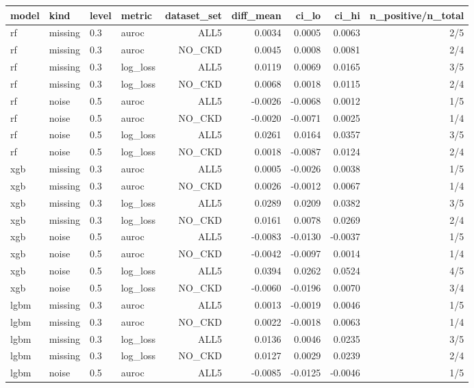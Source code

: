 \begin{tabular}{llllrrrrr}
\toprule
model & kind & level & metric & dataset\_set & diff\_mean & ci\_lo & ci\_hi & n\_positive/n\_total \\
\midrule
rf & missing & 0.3 & auroc & ALL5 & 0.0034 & 0.0005 & 0.0063 & 2/5 \\
rf & missing & 0.3 & auroc & NO\_CKD & 0.0045 & 0.0008 & 0.0081 & 2/4 \\
rf & missing & 0.3 & log\_loss & ALL5 & 0.0119 & 0.0069 & 0.0165 & 3/5 \\
rf & missing & 0.3 & log\_loss & NO\_CKD & 0.0068 & 0.0018 & 0.0115 & 2/4 \\
rf & noise & 0.5 & auroc & ALL5 & -0.0026 & -0.0068 & 0.0012 & 1/5 \\
rf & noise & 0.5 & auroc & NO\_CKD & -0.0020 & -0.0071 & 0.0025 & 1/4 \\
rf & noise & 0.5 & log\_loss & ALL5 & 0.0261 & 0.0164 & 0.0357 & 3/5 \\
rf & noise & 0.5 & log\_loss & NO\_CKD & 0.0018 & -0.0087 & 0.0124 & 2/4 \\
xgb & missing & 0.3 & auroc & ALL5 & 0.0005 & -0.0026 & 0.0038 & 1/5 \\
xgb & missing & 0.3 & auroc & NO\_CKD & 0.0026 & -0.0012 & 0.0067 & 1/4 \\
xgb & missing & 0.3 & log\_loss & ALL5 & 0.0289 & 0.0209 & 0.0382 & 3/5 \\
xgb & missing & 0.3 & log\_loss & NO\_CKD & 0.0161 & 0.0078 & 0.0269 & 2/4 \\
xgb & noise & 0.5 & auroc & ALL5 & -0.0083 & -0.0130 & -0.0037 & 1/5 \\
xgb & noise & 0.5 & auroc & NO\_CKD & -0.0042 & -0.0097 & 0.0014 & 1/4 \\
xgb & noise & 0.5 & log\_loss & ALL5 & 0.0394 & 0.0262 & 0.0524 & 4/5 \\
xgb & noise & 0.5 & log\_loss & NO\_CKD & -0.0060 & -0.0196 & 0.0070 & 3/4 \\
lgbm & missing & 0.3 & auroc & ALL5 & 0.0013 & -0.0019 & 0.0046 & 1/5 \\
lgbm & missing & 0.3 & auroc & NO\_CKD & 0.0022 & -0.0018 & 0.0063 & 1/4 \\
lgbm & missing & 0.3 & log\_loss & ALL5 & 0.0136 & 0.0046 & 0.0235 & 3/5 \\
lgbm & missing & 0.3 & log\_loss & NO\_CKD & 0.0127 & 0.0029 & 0.0239 & 2/4 \\
lgbm & noise & 0.5 & auroc & ALL5 & -0.0085 & -0.0125 & -0.0046 & 1/5 \\

\end{tabular}

